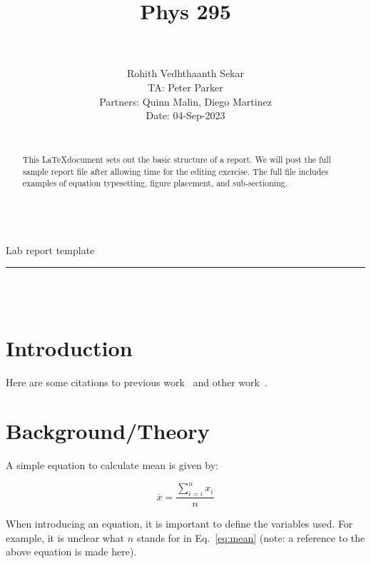 \documentclass[12pt]{article}
\title{\textbf{Phys 295}}
\author{\noindent\rule{8cm}{0.4pt}\\
Rohith Vedhthaanth Sekar\\
TA: Peter Parker\\
Partners: Quinn Malin, Diego Martinez\\
Date: 04-Sep-2023\\
\noindent\rule{8cm}{0.4pt}
}
\begin{document}


\makeatletter
\begin{titlepage}
\begin{center}
\vspace{1in}
\begingroup
\Large{\@title\\[0.5em]Lab report template}
\endgroup\\
\noindent\rule{16cm}{0.4pt}\\[10em]
\@author\\[1em]
\end{center}


\begin{abstract}
This \LaTeX document sets out the basic structure of a report.  We will post the full sample report file after allowing time for the editing exercise.  The full file includes examples of equation typesetting, figure placement, and sub-sectioning. 
\end{abstract}
\end{titlepage}
\makeatletter


\newpage
\section{Introduction}
Here are some citations to previous work~\cite{Dyson1920} and other work~\cite{Abbot2016}.


\section{Background/Theory}

A simple equation to calculate mean is given by:

\begin{equation} \label{eq:mean}
     \overline{x}=\frac{\sum_{i=i}^{n} x_{i}}{n} 
\end{equation}

When introducing an equation, it is important to define the variables used. For example, it is unclear what $n$ stands for in Eq.\ \ref{eq:mean} (note: a reference to the above equation is made here).
\end{document}
